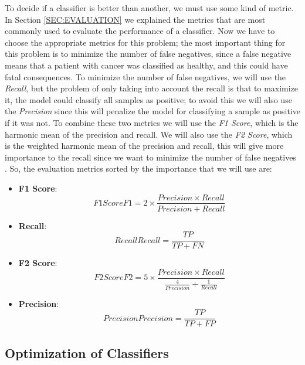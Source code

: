To decide if a classifier is better than another, we must use some kind of metric. In Section \ref{SEC:EVALUATION} we explained the metrics that are most commonly used to evaluate the performance of a classifier. Now we have to choose the appropriate metrics for this problem; the most important thing for this problem is to minimize the number of false negatives, since a false negative means that a patient with cancer was classified as healthy, and this could have fatal consequences. To minimize the number of false negatives, we will use the \textit{Recall}, but the problem of only taking into account the recall is that to maximize it, the model could classify all samples as positive; to avoid this we will also use the \textit{Precision} since this will penalize the model for classifying a sample as positive if it was not. To combine these two metrics we will use the \textit{F1 Score}, which is the harmonic mean of the precision and recall. We will also use the \textit{F2 Score}, which is the weighted harmonic mean of the precision and recall, this will give more importance to the recall since we want to minimize the number of false negatives \cite{rutecki_best_nodate}. So, the evaluation metrics sorted by the importance that we will use are:

\begin{itemize}
    \item \textbf{F1 Score}: \begin{equation}[EQ:F1SCORE]{F1 Score}
        F1 = 2 \times \frac{Precision \times Recall}{Precision + Recall}
    \end{equation}
    \item \textbf{Recall}: \begin{equation}[EQ:RECALL]{Recall}
        Recall = \frac{TP}{TP + FN}
    \end{equation}
    \item \textbf{F2 Score}: \begin{equation}[EQ:F2SCORE]{F2 Score}
        F2 = 5 \times \frac{Precision \times Recall}{\frac{4}{Precision} + \frac{1}{Recall}}
    \end{equation}
    \item \textbf{Precision}: \begin{equation}[EQ:PRECISION]{Precision}
        Precision = \frac{TP}{TP + FP}
    \end{equation}
\end{itemize}

\subsection{Optimization of Classifiers}

